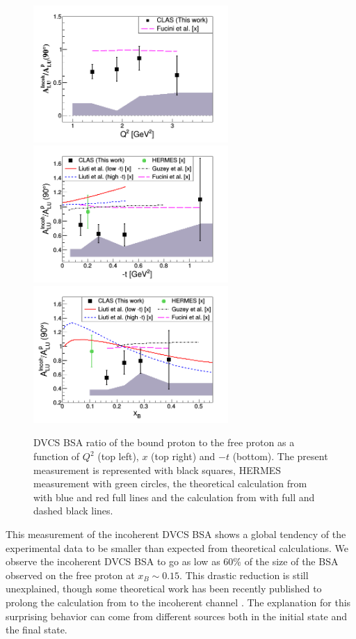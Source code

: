 \documentclass[aps,prc,preprint,superscriptaddress]{revtex4}
\begin{document}
\begin{figure}[tbp!]
\center
\includegraphics[width=7.4cm]{fig3/ALU_ratioInc_Q2_shortscenrario.png}
\includegraphics[width=7.4cm]{fig3/ALU_ratioInc_t_shortscenrario.png}
\includegraphics[width=7.4cm]{fig3/ALU_ratioInc_x_shortscenrario.png}
	\caption{DVCS BSA ratio of the bound proton to the free proton as a function of 
	$Q^2$ (top left), $x$ (top right) and $-t$ (bottom). The present measurement is 
	represented with black squares, HERMES 
	measurement \cite{Airapetian:2009cga} with green circles, the theoretical 
	calculation from \cite{Liuti:2005gi} with blue and red full lines and the
	calculation from \cite{Guzey:2008fe} with full and dashed black lines.}
\label{fig:IncRatios}
\end{figure}

This measurement of the incoherent DVCS BSA shows a global tendency of the experimental data 
to be smaller than expected from theoretical calculations. We observe the incoherent DVCS 
BSA to go as low as 60\% of the size of the BSA observed
on the free proton at $x_B \sim 0.15$. This drastic reduction is still unexplained, though some theoretical 
work has been recently published to prolong the calculation from \cite{Fucini:2018gso} to the incoherent 
channel \cite{Fucini:2019xlc}. The explanation for this surprising behavior can come from different sources
both in the initial state and the final state. 
\end{document}
